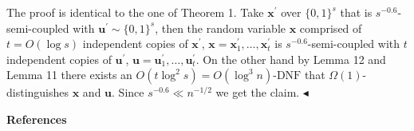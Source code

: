 The proof is identical to the one of Theorem 1. Take $\bm{x}^{\prime}$ over $\{0,1\}^{s}$ that is $s^{-0.6}$-semi-coupled with $\bm{u}^{\prime}\sim\{0,1\}^{s}$, then the random variable $\bm{x}$ comprised of $t=O(\log s)$ independent copies of $\bm{x}^{\prime}$, $\bm{x}=\bm{x}^{\prime}_{1},\dots,\bm{x}^{\prime}_{t}$ is $s^{-0.6}$-semi-coupled with $t$ independent copies of $\bm{u}^{\prime}$, $\bm{u}=\bm{u}^{\prime}_{1},\dots,\bm{u}^{\prime}_{t}$. On the other hand by Lemma 12 and Lemma 11 there exists an $O(t\log^{2}s)=O(\log^{3}n)$-$\mathrm{DNF}$ that $\Omega(1)$-distinguishes $\bm{x}$ and $\bm{u}$. Since $s^{-0.6}\ll n^{-1/2}$ we get the claim.
$\blacktriangleleft$\par







\par\medskip\noindent\textbf{References}\par




